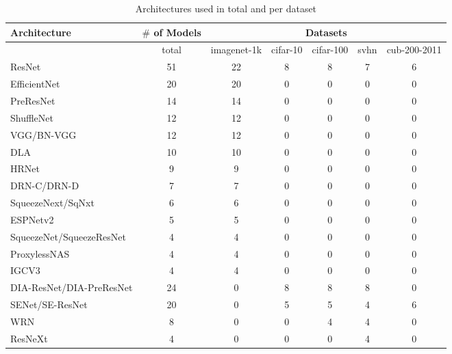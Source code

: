 
\begin{table}[t]
\small
\begin{center}
\begin{tabular}{|l|c|c|c|c|c|c|}
\hline
Architecture & $\#$ of Models & 
\multicolumn{5}{|c|}{ Datasets } \\
\hline

  & total &imagenet-1k & cifar-10 & cifar-100 & svhn & cub-200-2011 \\
\hline
ResNet & 51 &22 & 8 & 8 & 7 & 6 \\
EfficientNet & 20 &20 & 0 & 0 & 0 & 0 \\
PreResNet & 14 &14 & 0 & 0 & 0 & 0 \\
ShuffleNet & 12 &12 & 0 & 0 & 0 & 0 \\
VGG/BN-VGG & 12 &12 & 0 & 0 & 0 & 0 \\
DLA & 10 &10 & 0 & 0 & 0 & 0 \\
HRNet & 9 &9 & 0 & 0 & 0 & 0 \\
DRN-C/DRN-D & 7 &7 & 0 & 0 & 0 & 0 \\
SqueezeNext/SqNxt & 6 &6 & 0 & 0 & 0 & 0 \\
ESPNetv2 & 5 &5 & 0 & 0 & 0 & 0 \\
SqueezeNet/SqueezeResNet & 4 &4 & 0 & 0 & 0 & 0 \\
ProxylessNAS & 4 &4 & 0 & 0 & 0 & 0 \\
IGCV3 & 4 &4 & 0 & 0 & 0 & 0 \\
DIA-ResNet/DIA-PreResNet & 24 &0 & 8 & 8 & 8 & 0 \\
SENet/SE-ResNet & 20 &0 & 5 & 5 & 4 & 6 \\
WRN & 8 &0 & 0 & 4 & 4 & 0 \\
ResNeXt & 4 &0 & 0 & 0 & 4 & 0 \\

\hline
\end{tabular}
\end{center}
\caption{Architectures used in total and per dataset}
\label{table:architectures}
\end{table}

